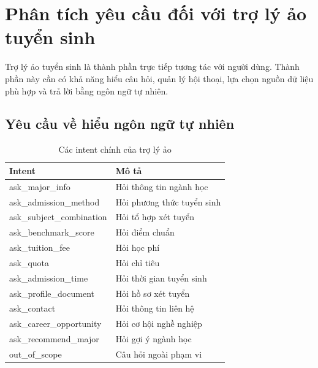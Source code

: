 \section{Phân tích yêu cầu đối với trợ lý ảo tuyển sinh}

Trợ lý ảo tuyển sinh là thành phần trực tiếp tương tác với người dùng. Thành phần này cần có khả năng hiểu câu hỏi, quản lý hội thoại, lựa chọn nguồn dữ liệu phù hợp và trả lời bằng ngôn ngữ tự nhiên.

\subsection{Yêu cầu về hiểu ngôn ngữ tự nhiên}
\begin{table}[H]
\centering
\caption{Các intent chính của trợ lý ảo}
\label{tab:intents_main}
\begin{tabular}{|p{4.2cm}|p{7.8cm}|}
\hline
\textbf{Intent} & \textbf{Mô tả} \\ \hline
ask\_major\_info & Hỏi thông tin ngành học \\ \hline
ask\_admission\_method & Hỏi phương thức tuyển sinh \\ \hline
ask\_subject\_combination & Hỏi tổ hợp xét tuyển \\ \hline
ask\_benchmark\_score & Hỏi điểm chuẩn \\ \hline
ask\_tuition\_fee & Hỏi học phí \\ \hline
ask\_quota & Hỏi chỉ tiêu \\ \hline
ask\_admission\_time & Hỏi thời gian tuyển sinh \\ \hline
ask\_profile\_document & Hỏi hồ sơ xét tuyển \\ \hline
ask\_contact & Hỏi thông tin liên hệ \\ \hline
ask\_career\_opportunity & Hỏi cơ hội nghề nghiệp \\ \hline
ask\_recommend\_major & Hỏi gợi ý ngành học \\ \hline
out\_of\_scope & Câu hỏi ngoài phạm vi \\ \hline
\end{tabular}
\end{table}

